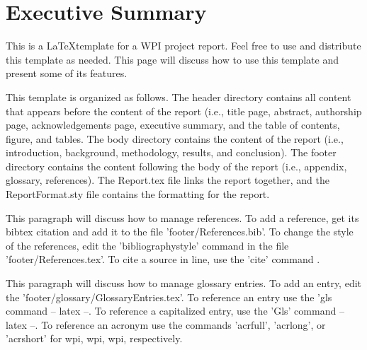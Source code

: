 \chapter*{Executive Summary}

This is a \LaTeX template for a WPI project report. Feel free to use and distribute this template as needed. This page will discuss how to use this template and present some of its features. 

This template is organized as follows. The header directory contains all content that appears before the content of the report (i.e., title page, abstract, authorship page, acknowledgements page, executive summary, and the table of contents, figure, and tables. The body directory contains the content of the report (i.e., introduction, background, methodology, results, and conclusion). The footer directory contains the content following the body of the report (i.e., appendix, glossary, references). The Report.tex file links the report together, and the ReportFormat.sty file contains the formatting for the report. 

This paragraph will discuss how to manage references. To add a reference, get its bibtex citation and add it to the file 'footer/References.bib'. To change the style of the references, edit the 'bibliographystyle' command in the file 'footer/References.tex'. To cite a source in line, use the 'cite' command \cite{source1}.

This paragraph will discuss how to manage glossary entries. To add an entry, edit the 'footer/glossary/GlossaryEntries.tex'. To reference an entry use the 'gls command -- \gls{latex} --. To reference a capitalized entry, use the 'Gls' command -- \Gls{latex} --. To reference an acronym use the commands 'acrfull', 'acrlong', or 'acrshort' for \acrfull{wpi}, \acrlong{wpi}, \acrshort{wpi}, respectively.





